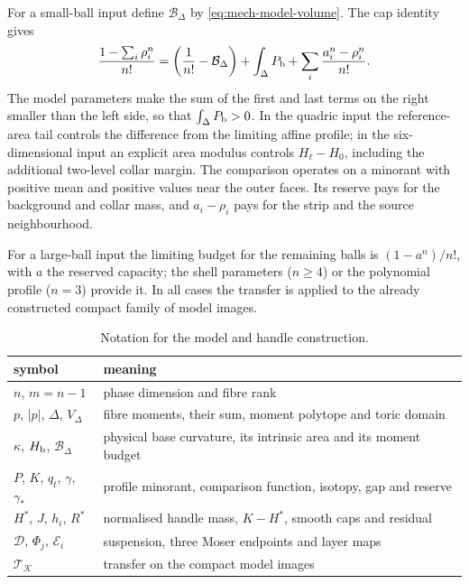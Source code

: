 For a small-ball input define $\mathcal B_\Delta$ by \eqref{eq:mech-model-volume}. The cap identity gives
\begin{equation}\label{eq:mech-budget}
 \frac{1-\sum_i\rho_i^n}{n!}
 =\left(\frac1{n!}-\mathcal B_\Delta\right)
   +\int_\Delta P_{\mathrm b}
   +\sum_i\frac{a_i^n-\rho_i^n}{n!}.
\end{equation}
The model parameters make the sum of the first and last terms on the right smaller than the left side, so that
$\int_\Delta P_{\mathrm b}>0$. In the quadric input the reference-area tail controls the difference from the limiting affine
profile; in the six-dimensional input an explicit area modulus controls $H_\ell-H_0$, including the
additional two-level collar margin. The comparison operates on a minorant with positive mean and
positive values near the outer faces. Its reserve pays for the background and collar mass, and
$a_i-\rho_i$ pays for the strip and the source neighbourhood.

For a large-ball input the limiting budget for the remaining balls is $(1-a^n)/n!$, with $a$ the
reserved capacity; the shell parameters ($n\ge4$) or the polynomial profile ($n=3$) provide it. In all cases the
transfer is applied to the already constructed compact family of model images.

\begin{table}[ht]
\centering\footnotesize
\begin{tabular}{@{}ll@{}}
\toprule
symbol & meaning\\\midrule
$n$, $m=n-1$ & phase dimension and fibre rank\\
$p$, $|p|$, $\Delta$, $V_\Delta$ & fibre moments, their sum, moment polytope and toric domain\\
$\kappa$, $H_{\mathrm b}$, $\mathcal B_\Delta$ & physical base curvature, its intrinsic area and its moment budget\\
$P$, $K$, $q_t$, $\gamma$, $\gamma_*$ & profile minorant, comparison function, isotopy, gap and reserve\\
$H^*$, $J$, $h_i$, $R^*$ & normalised handle mass, $K-H^*$, smooth caps and residual\\
$\mathcal D$, $\Phi_j$, $\mathcal E_i$ & suspension, three Moser endpoints and layer maps\\
$\mathcal T_{\mathcal K}$ & transfer on the compact model images\\\bottomrule
\end{tabular}
\caption{Notation for the model and handle construction.}
\label{tab:mech-notation}
\end{table}
